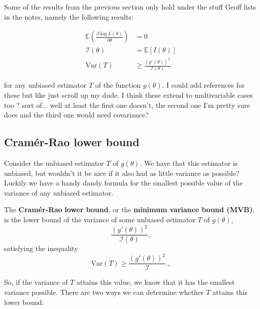 \bigskip

Some of the results from the previous section only hold under the stuff Geoff lists in the notes, namely the following results:

\begin{align*}
    \mathbb{E}\left(\frac{\partial \log L(\theta)}{\partial \theta}\right) &= 0\\
    \mathscr{I}(\theta) &= \mathbb{E}[I(\theta)]\\
    \text{Var}(T) &\geq \frac{(g'(\theta))^2}{\mathscr{I}(\theta)}
\end{align*}

for any unbiased estimator \(T\) of the function \(g(\theta)\). 
I could add references for these but like just scroll up my dude. 
I think these extend to multivariable cases too ? sort of... well at least the first one doesn't, the second one I'm pretty sure does and the third one would need covariance?

\subsection{Cram\'{e}r-Rao lower bound}\label{subsec:Cramer-Rao}

Consider the unbiased estimator \(T\) of \(g(\theta)\). 
We have that this estimator is unbiased, but wouldn't it be nice if it also had as little variance as possible?
Luckily we have a handy dandy formula for the smallest possible value of the variance of any unbiased estimator.

\begin{definition}\label{defn:cramer}
    The \textbf{Cram\'{e}r-Rao} \textbf{lower bound}, or the \textbf{minimum variance bound (MVB)}, is the lower bound of the variance of some unbiased estimator \(T\) of \(g(\theta)\), 
    \begin{equation}\label{eq:MVB}
        \frac{\left(g'(\theta)\right)^2}{\mathscr{I}(\theta)},
    \end{equation}
    satisfying the inequality 
    \begin{equation}\label{eq:MVB inequality}
        \text{Var}(T) \geq \frac{\left(g'(\theta)\right)^2}{\mathscr{I}}.,
    \end{equation}
\end{definition}

So, if the variance of \(T\) attains this value, we know that it has the smallest variance possible. 
There are two ways we can determine whether \(T\) attains this lower bound:

